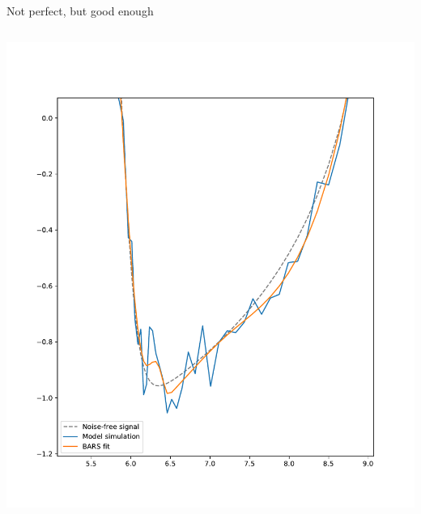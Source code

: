 \documentclass[presentation]{beamer}
\begin{document}
\begin{frame}[plain,label={sec:org4176b49}]{Not perfect, but good enough}
\begin{columns}
\begin{column}{0.5\columnwidth}
\begin{center}
\includegraphics[width=1.1\textwidth]{./barsbad2.pdf}
\end{center}
\end{column}
\end{columns}
\end{frame}
\end{document}
